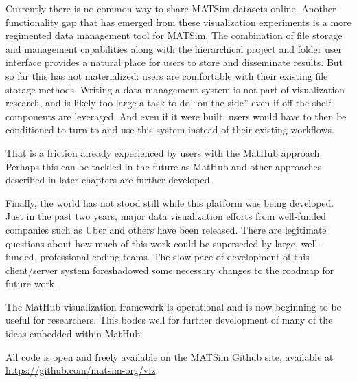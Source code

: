 Currently there is no common way to share MATSim datasets online. Another functionality gap that has emerged from these visualization experiments is a more regimented data management tool for MATSim. The combination of file storage and management capabilities along with the hierarchical project and folder user interface provides a natural place for users to store and disseminate results. But so far this has not materialized: users are comfortable with their existing file storage methods. Writing a data management system is not part of visualization research, and is likely too large a task to do ``on the side'' even if off-the-shelf components are leveraged. And even if it were built, users would have to then be conditioned to turn to and use this system instead of their existing workflows.

That is a friction already experienced by users with the MatHub approach. Perhaps this can be tackled in the future as MatHub and other approaches described in later chapters are further developed.

Finally, the world has not stood still while this platform was being developed. Just in the past two years, major data visualization efforts from well-funded companies such as Uber and others have been released. There are legitimate questions about how much of this work could be superseded by large, well-funded, professional coding teams. The slow pace of development of this client/server system foreshadowed some necessary changes to the roadmap for future work.

The MatHub visualization framework is operational and is now beginning to be useful for researchers. This bodes well for further development of many of the ideas embedded within MatHub.

All code is open and freely available on the MATSim Github site, available at \url{https://github.com/matsim-org/viz}.
